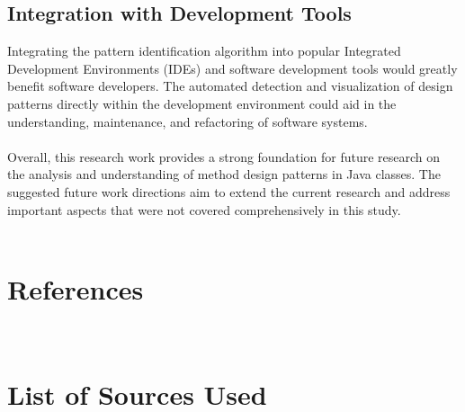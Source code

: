 \documentclass[draft]{article}
\begin{document}
\subsection{Integration with Development Tools}
Integrating the pattern identification algorithm into popular Integrated Development Environments (IDEs) and software development tools would greatly benefit software developers. The automated detection and visualization of design patterns directly within the development environment could aid in the understanding, maintenance, and refactoring of software systems.\\
~\\
Overall, this research work provides a strong foundation for future research on the analysis and understanding of method design patterns in Java classes. The suggested future work directions aim to extend the current research and address important aspects that were not covered comprehensively in this study.\\
~\\

\newpage
\section{References}
\begin{hangparas}{0.5in}{1}
~\\
\end{hangparas}

\newpage
\section*{List of Sources Used}
\begin{hangparas}{0.5in}{1}
~\\
\end{hangparas}
\end{document}
